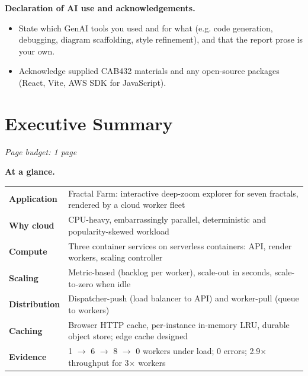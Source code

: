 \documentclass[a4paper,12pt]{article}
\newcommand{\budget}[1]{\hfill{\small\textcolor{mutedText}{\emph{Page budget: #1}}}\par}
\begin{document}
\begin{titlepage}
    \begin{summarybox}
    \textbf{Declaration of AI use and acknowledgements.}
    \end{summarybox}
    \begin{yourwriting}[-- declaration]
    \begin{itemize}
        \item State which GenAI tools you used and for what (e.g. code generation, debugging, diagram scaffolding, style refinement), and that the report prose is your own.
        \item Acknowledge supplied CAB432 materials and any open-source packages (React, Vite, AWS SDK for JavaScript).
    \end{itemize}
    \end{yourwriting}
\end{titlepage}

\section*{Executive Summary}
\budget{1 page}

\begin{summarybox}
\textbf{At a glance.}
\begin{tabularx}{\linewidth}{>{\bfseries}p{3.6cm} X}
Application & Fractal Farm: interactive deep-zoom explorer for seven fractals, rendered by a cloud worker fleet \\
Why cloud & CPU-heavy, embarrassingly parallel, deterministic and popularity-skewed workload \\
Compute & Three container services on serverless containers: API, render workers, scaling controller \\
Scaling & Metric-based (backlog per worker), scale-out in seconds, scale-to-zero when idle \\
Distribution & Dispatcher-push (load balancer to API) and worker-pull (queue to workers) \\
Caching & Browser HTTP cache, per-instance in-memory LRU, durable object store; edge cache designed \\
Evidence & 1 $\rightarrow$ 6 $\rightarrow$ 8 $\rightarrow$ 0 workers under load; 0 errors; 2.9$\times$ throughput for 3$\times$ workers \\
\end{tabularx}
\end{summarybox}
\end{document}
